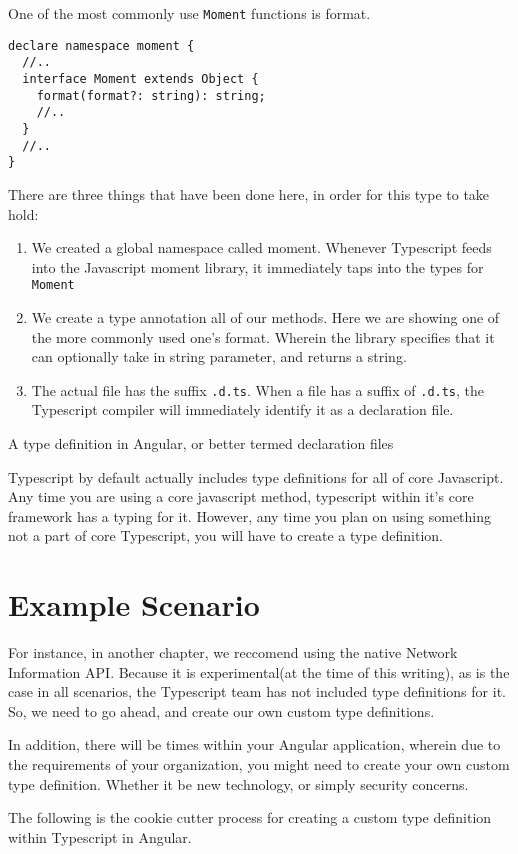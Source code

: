 One of the most commonly use \lstinline{Moment} functions is format.
\begin{lstlisting}[caption=moment.d.ts]
declare namespace moment {
  //..
  interface Moment extends Object {
    format(format?: string): string;
    //..
  }
  //..
}
\end{lstlisting}

There are three things that have been done here, in order for this type to take hold:
\begin{enumerate}
\item We created a global namespace called moment. Whenever Typescript feeds into the Javascript moment library, it immediately taps into the types for \lstinline{Moment}
\item We create a type annotation all of our methods. Here we are showing one of the more commonly used one's format. Wherein the library specifies that it can optionally take in string parameter, and returns a string.
\item The actual file has the suffix \lstinline{.d.ts}. When a file has a suffix of \lstinline{.d.ts}, the Typescript compiler will immediately identify it as a declaration file. 
\end{enumerate}

A type definition in Angular, or better termed declaration files 

Typescript by default actually includes type definitions for all of core
Javascript. Any time you are using a core javascript method, typescript
within it's core framework has a typing for it. However, any time you
plan on using something not a part of core Typescript, you will have to
create a type definition. 

\section{Example Scenario}
For instance, in another chapter, we reccomend using the native Network 
Information API. Because it is experimental(at the time of this writing),
as is the case in all scenarios, the Typescript team has not included 
type definitions for it. So, we need to go ahead, and create our own 
custom type definitions. 

In addition, there will be times within your Angular application, wherein 
due to the requirements of your organization, you might need to create your 
own custom type definition. Whether it be new technology, or simply security
concerns. 

The following is the cookie cutter process for creating a custom type 
definition within Typescript in Angular. 

